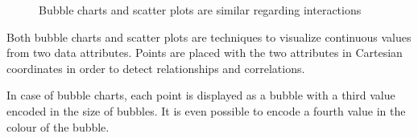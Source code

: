 \begin{figure}
  \centering
  \caption{Bubble charts and scatter plots are similar regarding interactions}%
  \label{fig:analysis:bubble-chart}
  \qquad
\end{figure}

Both bubble charts and scatter plots are techniques to visualize continuous values from two data attributes.
Points are placed with the two attributes in Cartesian coordinates in order to detect relationships and correlations.

In case of bubble charts, each point is displayed as a bubble with a third value encoded in the size of bubbles.
It is even possible to encode a fourth value in the colour of the bubble.

